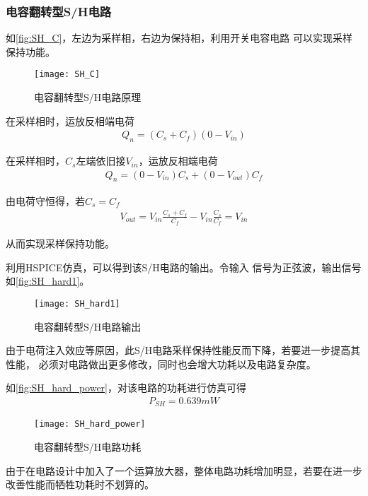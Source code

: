     \subsubsection{电容翻转型S/H电路}
    如\autoref{fig:SH_C}，左边为采样相，右边为保持相，利用开关电容电路
    可以实现采样保持功能。
    \begin{figure}[H]
        \centering
        \texttt{[image: SH\_C]}
        \caption{\label{fig:SH_C}电容翻转型S/H电路原理}
    \end{figure}
    \par 在采样相时，运放反相端电荷
    \begin{align}
        Q_{n}=\left(C_{s}+C_{f}\right)\left(0-V_{i n}\right)
    \end{align}
    \par 在采样相时，$ C_s $左端依旧接$ V_{in} $，运放反相端电荷
    \begin{align}
        Q_{n}=\left(0-V_{in}\right) C_{s}+\left(0-V_{o u t}\right) C_{f}
    \end{align}
    \par 由电荷守恒得，若$ C_s = C_f $
    \begin{align}
        V_{o u t}=V_{i n} \frac{C_{s}+C_{f}}{C_{f}}-V_{in} \frac{C_{s}}{C_{f}} = V_{in}
    \end{align}    
    \par 从而实现采样保持功能。
    \par 利用HSPICE仿真，可以得到该S/H电路的输出。令输入
    信号为正弦波，输出信号如\autoref{fig:SH_hard1}。
    \begin{figure}[H]
        \centering
        \texttt{[image: SH\_hard1]}
        \caption{\label{fig:SH_hard1}电容翻转型S/H电路输出}
    \end{figure}
    \par 由于电荷注入效应等原因，此S/H电路采样保持性能反而下降，若要进一步提高其性能，
    必须对电路做出更多修改，同时也会增大功耗以及电路复杂度。
    \par 如\autoref{fig:SH_hard_power}，对该电路的功耗进行仿真可得
    \begin{align}
        P_{SH} = 0.639mW
    \end{align}
    \begin{figure}[H]
        \centering
        \texttt{[image: SH\_hard\_power]}
        \caption{\label{fig:SH_hard_power}电容翻转型S/H电路功耗}
    \end{figure}
    \par 由于在电路设计中加入了一个运算放大器，整体电路功耗增加明显，若要在进一步
    改善性能而牺牲功耗时不划算的。

